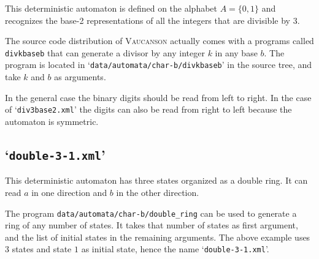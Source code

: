 \documentclass[a4paper]{report}
\newcommand\file[1]{`\texttt{#1}'}
\newcommand\command[1]{\texttt{#1}}
\newcommand{\Vauc}{\textsc{Vaucanson}\xspace}
\begin{document}

This deterministic automaton is defined on the alphabet
$A=\{0,1\}$ and recognizes the base-2 representations of all the
integers that are divisible by $3$.

The source code distribution of \Vauc actually comes with a
programs called \command{divkbaseb} that can generate a divisor
by any integer $k$ in any base $b$.  The program is located
in \file{data/automata/char-b/divkbaseb} in the source tree,
and take $k$ and $b$ as arguments.

In the general case the binary digits should be read from left to
right.  In the case of \file{div3base2.xml} the digits can also be
read from right to left because the automaton is symmetric.

\subsection{\file{double-3-1.xml}}


This deterministic automaton has three states organized as a double
ring.  It can read $a$ in one direction and $b$ in the other
direction.

The program \command{data/automata/char-b/double\_ring} can be used to
generate a ring of any number of states.  It takes that number of
states as first argument, and the list of initial states in the
remaining arguments.  The above example uses $3$ states and state $1$
as initial state, hence the name \file{double-3-1.xml}.
\end{document}
